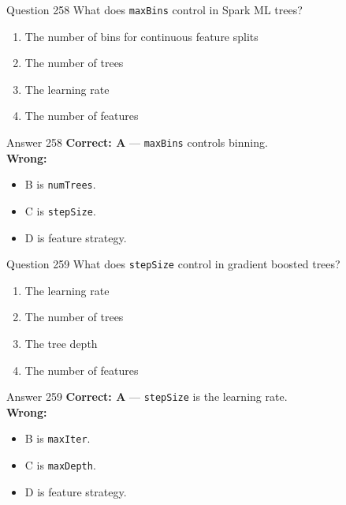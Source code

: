 \documentclass[aspectratio=169,11pt]{beamer}
\begin{document}
	\begin{frame}{Question 258}
		What does \texttt{maxBins} control in Spark ML trees?
		\begin{enumerate}[label=\Alph*.]
			\item The number of bins for continuous feature splits
			\item The number of trees
			\item The learning rate
			\item The number of features
		\end{enumerate}
	\end{frame}
	\begin{frame}{Answer 258}
		\textbf{Correct: A} --- \texttt{maxBins} controls binning.\\
		\vspace{0.5em}
		\textbf{Wrong:}
		\begin{itemize}
			\item B is \texttt{numTrees}.
			\item C is \texttt{stepSize}.
			\item D is feature strategy.
		\end{itemize}
	\end{frame}
	
	\begin{frame}{Question 259}
		What does \texttt{stepSize} control in gradient boosted trees?
		\begin{enumerate}[label=\Alph*.]
			\item The learning rate
			\item The number of trees
			\item The tree depth
			\item The number of features
		\end{enumerate}
	\end{frame}
	\begin{frame}{Answer 259}
		\textbf{Correct: A} --- \texttt{stepSize} is the learning rate.\\
		\vspace{0.5em}
		\textbf{Wrong:}
		\begin{itemize}
			\item B is \texttt{maxIter}.
			\item C is \texttt{maxDepth}.
			\item D is feature strategy.
		\end{itemize}
	\end{frame}
	
\end{document}
